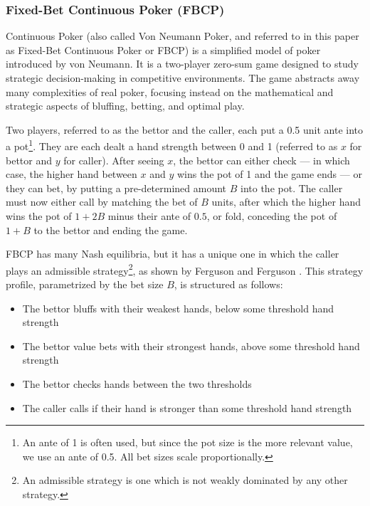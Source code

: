 \documentclass[../../main/main.tex]{subfiles}
\begin{document}
\subsubsection{Fixed-Bet Continuous Poker (FBCP)}

Continuous Poker (also called Von Neumann Poker, and referred to in this paper as Fixed-Bet Continuous Poker or FBCP) is a simplified model of poker introduced by von Neumann. It is a two-player zero-sum game designed to study strategic decision-making in competitive environments. The game abstracts away many complexities of real poker, focusing instead on the mathematical and strategic aspects of bluffing, betting, and optimal play.

\begin{definition}[FBCP]
Two players, referred to as the bettor and the caller, each put a 0.5 unit ante into a pot\footnote{An ante of 1 is often used, but since the pot size is the more relevant value, we use an ante of 0.5. All bet sizes scale proportionally.}. They are each dealt a hand strength between 0 and 1 (referred to as $x$ for bettor and $y$ for caller). After seeing $x$, the bettor can either check --- in which case, the higher hand between $x$ and $y$ wins the pot of 1 and the game ends --- or they can bet, by putting a pre-determined amount $B$ into the pot. The caller must now either call by matching the bet of $B$ units, after which the higher hand wins the pot of $1+2B$ minus their ante of $0.5$, or fold, conceding the pot of $1+B$ to the bettor and ending the game.
\end{definition}

FBCP has many Nash equilibria, but it has a unique one in which the caller plays an admissible strategy\footnote{An admissible strategy is one which is not weakly dominated by any other strategy.}, as shown by Ferguson and Ferguson \cite[p. 2]{ferguson2003borel}. This strategy profile, parametrized by the bet size $B$, is structured as follows:

\begin{itemize}
    \item The bettor bluffs with their weakest hands, below some threshold hand strength
    \item The bettor value bets with their strongest hands, above some threshold hand strength
    \item The bettor checks hands between the two thresholds
    \item The caller calls if their hand is stronger than some threshold hand strength
\end{itemize}
\end{document}
